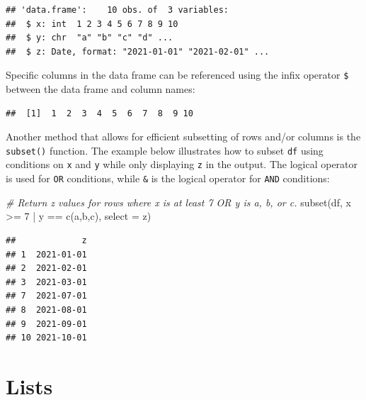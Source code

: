 \documentclass[
]{book}
\newenvironment{Shaded}{\begin{snugshade}}{\end{snugshade}}
\newcommand{\AttributeTok}[1]{\textcolor[rgb]{0.77,0.63,0.00}{#1}}
\newcommand{\CommentTok}[1]{\textcolor[rgb]{0.56,0.35,0.01}{\textit{#1}}}
\newcommand{\DecValTok}[1]{\textcolor[rgb]{0.00,0.00,0.81}{#1}}
\newcommand{\FunctionTok}[1]{\textcolor[rgb]{0.00,0.00,0.00}{#1}}
\newcommand{\NormalTok}[1]{#1}
\newcommand{\SpecialCharTok}[1]{\textcolor[rgb]{0.00,0.00,0.00}{#1}}
\newcommand{\StringTok}[1]{\textcolor[rgb]{0.31,0.60,0.02}{#1}}
\begin{document}
\begin{verbatim}
## 'data.frame':    10 obs. of  3 variables:
##  $ x: int  1 2 3 4 5 6 7 8 9 10
##  $ y: chr  "a" "b" "c" "d" ...
##  $ z: Date, format: "2021-01-01" "2021-02-01" ...
\end{verbatim}

Specific columns in the data frame can be referenced using the infix operator \texttt{\$} between the data frame and column names:

\begin{Shaded}
\end{Shaded}

\begin{verbatim}
##  [1]  1  2  3  4  5  6  7  8  9 10
\end{verbatim}

Another method that allows for efficient subsetting of rows and/or columns is the \texttt{subset()} function. The example below illustrates how to subset \texttt{df} using conditions on \texttt{x} and \texttt{y} while only displaying \texttt{z} in the output. The logical operator \texttt{\textbar{}} is used for \texttt{OR} conditions, while \texttt{\&} is the logical operator for \texttt{AND} conditions:

\begin{Shaded}
\begin{Highlighting}[]
\CommentTok{\# Return z values for rows where x is at least 7 OR y is a, b, or c.}
\FunctionTok{subset}\NormalTok{(df, x }\SpecialCharTok{\textgreater{}=} \DecValTok{7} \SpecialCharTok{|}\NormalTok{ y }\SpecialCharTok{==} \FunctionTok{c}\NormalTok{(}\StringTok{\textquotesingle{}a\textquotesingle{}}\NormalTok{,}\StringTok{\textquotesingle{}b\textquotesingle{}}\NormalTok{,}\StringTok{\textquotesingle{}c\textquotesingle{}}\NormalTok{), }\AttributeTok{select =}\NormalTok{ z)}
\end{Highlighting}
\end{Shaded}

\begin{verbatim}
##             z
## 1  2021-01-01
## 2  2021-02-01
## 3  2021-03-01
## 7  2021-07-01
## 8  2021-08-01
## 9  2021-09-01
## 10 2021-10-01
\end{verbatim}

\hypertarget{lists}{%
\section{Lists}\label{lists}}
\end{document}
